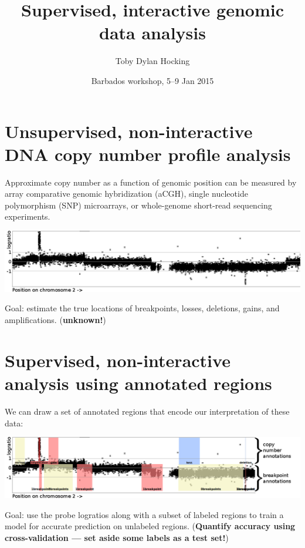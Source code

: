 \documentclass[a4paper,10pt]{article} %
\begin{document}
\title{Supervised, interactive genomic data analysis
}
\author{
  Toby Dylan Hocking
}

\date{Barbados workshop, 5--9 Jan 2015}

\maketitle

\thispagestyle{empty}%
\pagestyle{empty}

\section*{Unsupervised, non-interactive
  DNA copy number profile analysis}

Approximate copy number as a function of genomic position can be
measured by array comparative genomic hybridization (aCGH), single
nucleotide polymorphism (SNP) microarrays, or whole-genome short-read
sequencing experiments.

\includegraphics[width=\textwidth]{unlabeled-axes}

Goal: estimate the true locations of breakpoints, losses,
deletions, gains, and amplifications. (\textbf{unknown!})

\section*{Supervised, non-interactive
 analysis using annotated regions}

We can draw a set of annotated regions that encode our interpretation
of these data:

\includegraphics[width=\textwidth]{regions-axes-full}

Goal: use the probe logratios along with a subset of labeled regions
to train a model for accurate prediction on unlabeled
regions. (\textbf{Quantify accuracy using cross-validation --- set
  aside some labels as a test set!})
\end{document}
